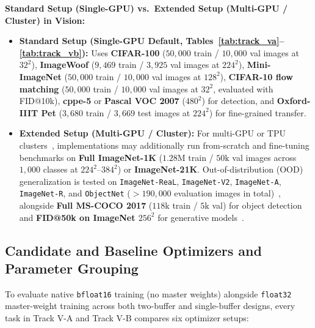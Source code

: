 \documentclass[11pt,a4paper]{article}
\renewcommand{\_}{\origunderscore\allowbreak}
\begin{document}
\noindent
\textbf{Standard Setup (Single-GPU) vs.\ Extended Setup (Multi-GPU / Cluster) in Vision:}
\begin{itemize}[leftmargin=1.8em, itemsep=0.35em]
    \item \textbf{Standard Setup (Single-GPU Default, Tables~\ref{tab:track_va}--\ref{tab:track_vb}):} Uses \textbf{CIFAR-100} ($50,000$ train / $10,000$ val images at $32^2$), \textbf{ImageWoof} ($9,469$ train / $3,925$ val images at $224^2$), \textbf{Mini-ImageNet} ($50,000$ train / $10,000$ val images at $128^2$), \textbf{CIFAR-10 flow matching} ($50,000$ train / $10,000$ val images at $32^2$, evaluated with FID@10k), \textbf{cppe-5} or \textbf{Pascal VOC 2007} ($480^2$) for detection, and \textbf{Oxford-IIIT Pet} ($3,680$ train / $3,669$ test images at $224^2$) for fine-grained transfer.
    \item \textbf{Extended Setup (Multi-GPU / Cluster):} For multi-GPU or TPU clusters~\cite{chen2023lion,brock2021nfnet,taniguchi2024adopt}, implementations may additionally run from-scratch and fine-tuning benchmarks on \textbf{Full ImageNet-1K} ($1.28\text{M}$ train / $50\text{k}$ val images across $1,000$ classes at $224^2$--$384^2$) or \textbf{ImageNet-21K}. Out-of-distribution (OOD) generalization is tested on \texttt{ImageNet-ReaL}, \texttt{ImageNet-V2}, \texttt{ImageNet-A}, \texttt{ImageNet-R}, and \texttt{ObjectNet} ($> 190,000$ evaluation images in total)~\cite{chen2023lion}, alongside \textbf{Full MS-COCO 2017} ($118\text{k}$ train / $5\text{k}$ val) for object detection and \textbf{FID@50k on ImageNet $256^2$} for generative models~\cite{ma2024sit}.
\end{itemize}

\subsection{Candidate and Baseline Optimizers and Parameter Grouping}
\noindent
To evaluate native \texttt{bfloat16} training (no master weights) alongside \texttt{float32} master-weight training across both two-buffer and single-buffer designs, every task in Track V-A and Track V-B compares six optimizer setups:
\end{document}
